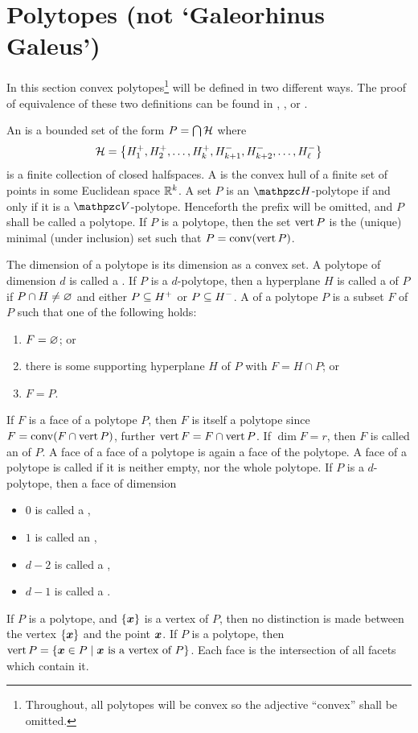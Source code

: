 \section{Polytopes (not `Galeorhinus Galeus')}

In this section convex polytopes\footnote{Throughout, all polytopes will be convex so the adjective ``convex'' shall be omitted.} will be defined in two different ways.  The proof of equivalence of these two definitions can be found in \cite{BronstedBook}, \cite{GrunBook}, \cite{McMullenBook} or \cite{ZieglerBook}.

An  is a bounded set of the form \(P=\bigcap\mathcal{H}\) where
    \[
        \mathcal{H}=\left\{H_1^+, H_2^+,\dotsc, H_k^+, H_{k+1}^-,H_{k+2}^-,\dotsc, H_\ell^-\right\}
    \]
is a finite collection of closed halfspaces.  A  is the convex hull of a finite set of points in some Euclidean space \(\mathbb{R}^{k}\).  A set \(P\) is  an \(\mathpzc H\)-polytope if and only if it is a \(\mathpzc V\)-polytope.  Henceforth the prefix will be omitted, and \(P\) shall be called a polytope.  If \(P\) is a polytope, then the set \(\operatorname{vert} P\) is the (unique) minimal (under inclusion) set such that \(P=\operatorname{conv}(\operatorname{vert} P)\).

The dimension of a polytope is its dimension as a convex set.  A polytope of dimension \(d\) is called a .  If \(P\) is a \(d\)-polytope, then  a hyperplane \(H\) is called a  of \(P\) if \(P\cap H\ne\varnothing\) and either \(P\subseteq H^+\) or \(P\subseteq H^-\).  A  of a polytope \(P\) is a subset \(F\) of \(P\) such that one of the following holds:
    \begin{enumerate}
        \item   \(F=\varnothing\); or
        \item   there is some supporting hyperplane \(H\) of \(P\) with \(F=H\cap P\); or
        \item   \(F=P\).
    \end{enumerate}
If \(F\) is a face of a polytope \(P\), then \(F\) is itself a polytope since \(F=\operatorname{conv}(F\cap\operatorname{vert} P)\), further \(\operatorname{vert} F=F\cap\operatorname{vert} P\).  If \(\dim F=r\), then \(F\) is called an  of \(P\).  A face of a face of a polytope is again a face of the polytope.  A face of a polytope is called  if it is neither empty, nor the whole polytope.  If \(P\) is a \(d\)-polytope, then a face of dimension
    \begin{itemize}
        \item   \(0\) is called a ,
        \item   \(1\) is called an ,
        \item   \(d-2\) is called a ,
        \item   \(d-1\) is called a .
    \end{itemize}
If \(P\) is a polytope, and \(\left\{\bm{x}\right\}\) is a vertex of \(P\), then no distinction is made between the vertex \(\left\{\bm{x}\right\}\) and the point \(\bm{x}\).  If \(P\) is a polytope, then \(\vrt P=\setb{\ve x\in P}{\ve x\text{ is a vertex of }P}\).  Each face is the intersection of all facets which contain it.

